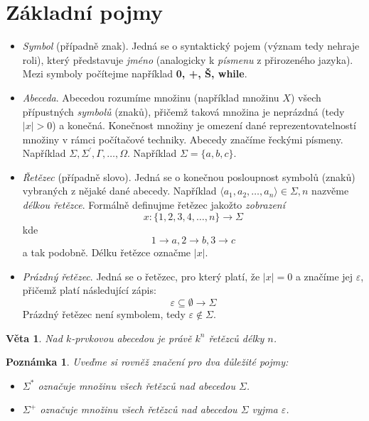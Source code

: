 \documentclass[10pt, a4paper, titlepage]{article}
\theoremstyle{note}
\newtheorem{veta}{Věta}
\newtheorem{poznamka}{Poznámka}
\begin{document}
\section{Základní pojmy}
\begin{itemize}
\item
\textit{Symbol} (případně znak). Jedná se o syntaktický pojem (význam tedy nehraje roli), který představuje \emph{jméno} (analogicky k \emph{písmenu} z přirozeného jazyka).
Mezi symboly počítejme například \textbf{0, +, Š, while}.

\item
\textit{Abeceda}. Abecedou rozumíme množinu (například množinu $X$) všech přípustných \emph{symbolů} (znaků), přičemž taková množina je neprázdná (tedy $|x|>0$) a konečná.
Konečnost množiny je omezení dané reprezentovatelností množiny v rámci počítačové techniky.
Abecedy značíme řeckými písmeny. Například $\Sigma, \Sigma^{'}, \Gamma, \ldots, \Omega$.
Například $\Sigma = \lbrace a, b, c \rbrace$.

\item
\textit{Řetězec} (případně slovo). Jedná se o konečnou posloupnost symbolů (znaků) vybraných z nějaké dané abecedy.
Například $\langle a_{1}, a_{2}, \ldots, a_{n} \rangle \in \Sigma, n$ nazvěme \emph{délkou řetězce}.
Formálně definujme řetězec jakožto \emph{zobrazení}
$$
x : \lbrace 1, 2, 3, 4, \ldots, n \rbrace \rightarrow \Sigma
$$
kde
$$
1 \rightarrow a, 2 \rightarrow b, 3 \rightarrow c
$$ a tak podobně.
Délku řetězce označme $|x|$.

\item
\textit{Prázdný řetězec}. Jedná se o řetězec, pro který platí, že $|x| = 0$ a značíme jej $\varepsilon$, přičemž platí následující zápis:
$$
\varepsilon \subseteq \emptyset \rightarrow \Sigma
$$
Prázdný řetězec není symbolem, tedy $\varepsilon \notin \Sigma$.
\end{itemize}

\begin{veta}
Nad $k$-prvkovou abecedou je právě $k^{n}$ řetězců délky $n$.
\end{veta}


\begin{poznamka}
Uveďme si rovněž značení pro dva důležité pojmy:

\begin{itemize}
\item
$\Sigma^{*}$ označuje množinu všech řetězců nad abecedou $\Sigma$.

\item
$\Sigma^{+}$ označuje množinu všech řetězců nad abecedou $\Sigma$ vyjma $\varepsilon$.
\end{itemize}
\end{poznamka}
\end{document}
